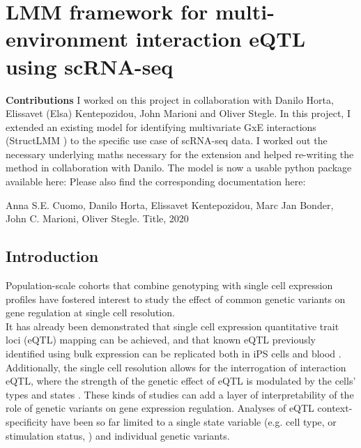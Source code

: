 
\chapter{LMM framework for multi-environment interaction eQTL using scRNA-seq}

\begin{Comment2}
\hspace{-3mm}\textbf{Contributions} I worked on this project in collaboration with Danilo Horta, Elissavet (Elsa) Kentepozidou, John Marioni and Oliver Stegle.
In this project, I extended an existing model for identifying multivariate GxE interactions (StructLMM \cite{moore2019linear}) to the specific use case of scRNA-seq data.
I worked out the necessary underlying maths necessary for the extension and helped re-writing the method in collaboration with Danilo. 
The model is now a usable python package available here:
Please also find the corresponding documentation here:

Anna S.E. Cuomo, Danilo Horta, Elissavet Kentepozidou, Marc Jan Bonder, John C. Marioni, Oliver Stegle. 
Title, 2020

\end{Comment2}

\section{Introduction} 

Population-scale cohorts that combine genotyping with single cell expression profiles have fostered interest to study the effect of common genetic variants on gene regulation at single cell resolution.\\

It has already been demonstrated that single cell expression quantitative trait loci (eQTL) mapping can be achieved, and that known eQTL previously identified using bulk expression can be replicated both in iPS cells and blood \cite{cuomo2020single,van2018single}.
Additionally, the single cell resolution allows for the interrogation of interaction eQTL, where the strength of the genetic effect of eQTL is modulated by the cells’ types and states \cite{cuomo2020single}. 
These kinds of studies can add a layer of interpretability of the role of genetic variants on gene expression regulation. 
Analyses of eQTL context-specificity have been so far limited to a single state variable (e.g. cell type, \cite{fairfax2012genetics} or stimulation status,\cite{fairfax2014innate} ) and individual genetic variants.\\

